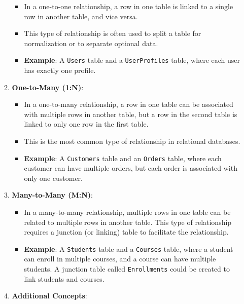 \documentclass[12pt, french]{article}
\providecommand{\tightlist}{%
      \setlength{\itemsep}{0pt}\setlength{\parskip}{0pt}}
\begin{document}
\begin{enumerate}
\begin{enumerate}
    \begin{itemize}
    \tightlist
    \item
      In a one-to-one relationship, a row in one table is linked to a
      single row in another table, and vice versa.
    \item
      This type of relationship is often used to split a table for
      normalization or to separate optional data.
    \item
      \textbf{Example}: A \texttt{Users} table and a
      \texttt{UserProfiles} table, where each user has exactly one
      profile.
    \end{itemize}
  \item
    \textbf{One-to-Many (1:N)}:

    \begin{itemize}
    \tightlist
    \item
      In a one-to-many relationship, a row in one table can be
      associated with multiple rows in another table, but a row in the
      second table is linked to only one row in the first table.
    \item
      This is the most common type of relationship in relational
      databases.
    \item
      \textbf{Example}: A \texttt{Customers} table and an
      \texttt{Orders} table, where each customer can have multiple
      orders, but each order is associated with only one customer.
    \end{itemize}
  \item
    \textbf{Many-to-Many (M:N)}:

    \begin{itemize}
    \tightlist
    \item
      In a many-to-many relationship, multiple rows in one table can be
      related to multiple rows in another table. This type of
      relationship requires a junction (or linking) table to facilitate
      the relationship.
    \item
      \textbf{Example}: A \texttt{Students} table and a \texttt{Courses}
      table, where a student can enroll in multiple courses, and a
      course can have multiple students. A junction table called
      \texttt{Enrollments} could be created to link students and
      courses.
    \end{itemize}
  \item
    \textbf{Additional Concepts}:


\end{enumerate}
\end{enumerate}
\end{document}
